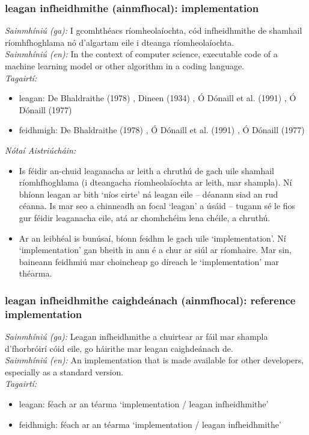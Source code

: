 \documentclass{article}
\begin{document}
\subsubsection*{leagan infheidhmithe (ainmfhocal): implementation}
 \noindent \textit{Sainmhíniú (ga):} I gcomhthéacs ríomheolaíochta, cód infheidhmithe de shamhail ríomhfhoghlama nó d'algartam eile i dteanga ríomheolaíochta.
\\
 \noindent \textit{Sainmhíniú (en):} In the context of computer science, executable code of a machine learning model or other algorithm in a coding language.
\\
 \noindent \textit{Tagairtí:}
\begin{itemize}
	\item leagan: De Bhaldraithe (1978) \cite{de-bhaldraithe}, Dineen (1934) \cite{dineen}, Ó Dónaill et al. (1991) \cite{focloir-beag}, Ó Dónaill (1977) \cite{odonaill}
	\item feidhmigh: De Bhaldraithe (1978) \cite{de-bhaldraithe}, Ó Dónaill et al. (1991) \cite{focloir-beag}, Ó Dónaill (1977) \cite{odonaill}
\end{itemize}

 \noindent \textit{Nótaí Aistriúcháin:}
\begin{itemize}
	\item Is féidir an-chuid leaganacha ar leith a chruthú de gach uile shamhail ríomhfhoghlama (i dteangacha ríomheolaíochta ar leith, mar shampla). Ní bhíonn leagan ar bith `níos cirte' ná leagan eile -- déanann siad an rud céanna. Is mar seo a chinneadh an focal `leagan' a úsáid -- tugann sé le fios gur féidir leaganacha eile, atá ar chomhchéim lena chéile, a chruthú.
	\item Ar an leibhéal is bunúsaí, bíonn feidhm le gach uile `implementation'. Ní `implementation' gan bheith in ann é a chur ar siúl ar ríomhaire. Mar sin, baineann feidhmiú mar choincheap go díreach le `implementation' mar théarma.
\end{itemize}


\subsubsection*{leagan infheidhmithe caighdeánach (ainmfhocal): reference implementation}
 \noindent \textit{Sainmhíniú (ga):} Leagan infheidhmithe a chuirtear ar fáil mar shampla d'fhorbróirí cóid eile, go háirithe mar leagan caighdeánach de.
\\
 \noindent \textit{Sainmhíniú (en):} An implementation that is made available for other developers, especially as a standard version.
\\
 \noindent \textit{Tagairtí:}
\begin{itemize}
	\item leagan: féach ar an téarma `implementation / leagan infheidhmithe'
	\item feidhmigh: féach ar an téarma `implementation / leagan infheidhmithe'
\end{itemize}
\end{document}
